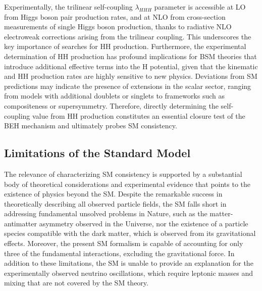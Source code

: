 Experimentally, the trilinear self-coupling $\lambda_{HHH}$ parameter is accessible at LO from Higgs boson pair production rates, and at NLO from cross-section measurements of single Higgs boson production, thanks to radiative NLO electroweak corrections arising from the trilinear coupling. This underscores the key importance of searches for HH production. Furthermore, the experimental determination of HH production has profound implications for BSM theories that introduce additional effective terms into the H potential, given that the kinematic and HH production rates are highly sensitive to new physics. Deviations from SM predictions may indicate the presence of extensions in the scalar sector, ranging from models with additional doublets or singlets to frameworks such as compositeness or supersymmetry. Therefore, directly determining the self-coupling value from HH production constitutes an essential closure test of the BEH mechanism and ultimately probes SM consistency.

\subsection{Limitations of the Standard Model}
\label{subsec:SM_limitations}
The relevance of characterizing SM consistency is supported by a substantial body of theoretical considerations and experimental evidence that points to the existence of physics beyond the SM. Despite the remarkable success in theoretically describing all observed particle fields, the SM falls short in addressing fundamental unsolved problems in Nature, such as the matter-antimatter asymmetry observed in the Universe, nor the existence of a particle species compatible with the dark matter, which is observed from its gravitational effects. Moreover, the present SM formalism is capable of accounting for only three of the fundamental interactions, excluding the gravitational force. In addition to these limitations, the SM is unable to provide an explanation for the experimentally observed neutrino oscillations, which require leptonic masses and mixing that are not covered by the SM theory.

